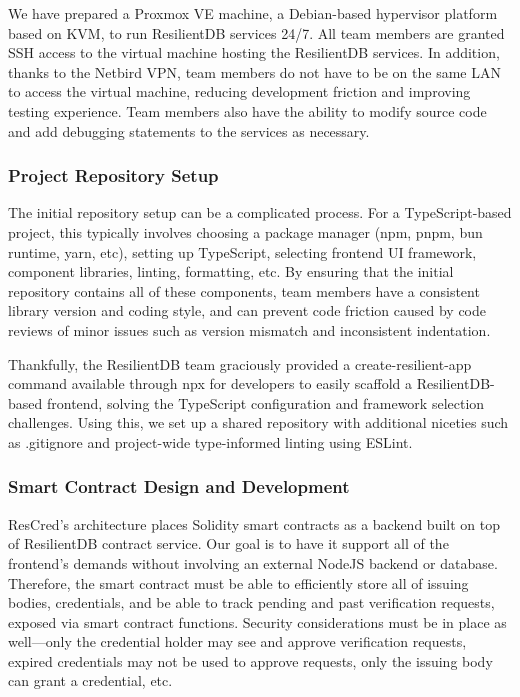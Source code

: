 We have prepared a Proxmox VE machine, a Debian-based hypervisor platform based on KVM, to run ResilientDB services 24/7. All team members are granted SSH access to the virtual machine hosting the ResilientDB services. In addition, thanks to the Netbird VPN, team members do not have to be on the same LAN to access the virtual machine, reducing development friction and improving testing experience. Team members also have the ability to modify source code and add debugging statements to the services as necessary.

\subsubsection{Project Repository Setup}

The initial repository setup can be a complicated process. For a TypeScript-based project, this typically involves choosing a package manager (npm, pnpm, bun runtime, yarn, etc), setting up TypeScript, selecting frontend UI framework, component libraries, linting, formatting, etc. By ensuring that the initial repository contains all of these components, team members have a consistent library version and coding style, and can prevent code friction caused by code reviews of minor issues such as version mismatch and inconsistent indentation.

Thankfully, the ResilientDB team graciously provided a create-resilient-app command available through npx for developers to easily scaffold a ResilientDB-based frontend, solving the TypeScript configuration and framework selection challenges. Using this, we set up a shared repository with additional niceties such as .gitignore and project-wide type-informed linting using ESLint.

\subsubsection{Smart Contract Design and Development}

ResCred’s architecture places Solidity smart contracts as a backend built on top of ResilientDB contract service. Our goal is to have it support all of the frontend’s demands without involving an external NodeJS backend or database. Therefore, the smart contract must be able to efficiently store all of issuing bodies, credentials, and be able to track pending and past verification requests, exposed via smart contract functions. Security considerations must be in place as well—only the credential holder may see and approve verification requests, expired credentials may not be used to approve requests, only the issuing body can grant a credential, etc.

